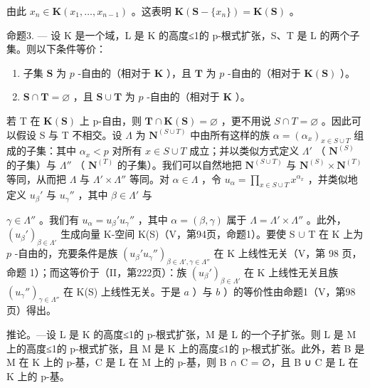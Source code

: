 由此 \(x_{n} \in \mathbf{K}(x_{1}, \ldots, x_{n-1})\) 。这表明 \(\mathbf{K}(\mathbf{S} - \{x_{n}\}) = \mathbf{K}(\mathbf{S})\) 。

命题3. --- 设 K 是一个域，L 是 K 的高度≤1的 p-根式扩张，S、T 是 L 的两个子集。则以下条件等价：

\begin{enumerate}
\def\labelenumi{\alph{enumi})}
\item
  子集 \(\mathbf{S}\) 为 \(p\) -自由的（相对于 \(\mathbf{K}\) ），且 \(\mathbf{T}\) 为 \(p\) -自由的（相对于 \(\mathbf{K}(\mathbf{S})\) ）。
\item
  \(\mathbf{S} \cap \mathbf{T} = \varnothing\) ，且 \(\mathbf{S} \cup \mathbf{T}\) 为 \(p\) -自由的（相对于 \(\mathbf{K}\) ）。
\end{enumerate}

若 T 在 \(\mathbf{K}(\mathbf{S})\) 上 p-自由，则 \(\mathbf{T} \cap \mathbf{K}(\mathbf{S}) = \varnothing\) ，更不用说 \(S \cap T = \varnothing\) 。因此可以假设 S 与 T 不相交。设 \(\Lambda\) 为 \(\mathbf{N}^{(S \cup T)}\) 中由所有这样的族 \(\alpha = (\alpha_x)_{x \in S \cup T}\) 组成的子集：其中 \(\alpha_x < p\) 对所有 \(x \in S \cup T\) 成立；并以类似方式定义 \(\Lambda'\) （ \(\mathbf{N}^{(S)}\) 的子集）与 \(\Lambda''\) （ \(\mathbf{N}^{(T)}\) 的子集）。我们可以自然地把 \(\mathbf{N}^{(S \cup T)}\) 与 \(\mathbf{N}^{(S)} \times \mathbf{N}^{(T)}\) 等同，从而把 \(\Lambda\) 与 \(\Lambda' \times \Lambda''\) 等同。对 \(\alpha \in \Lambda\) ，令 \(u_\alpha = \prod_{x \in S \cup T} x^{\alpha_x}\) ，并类似地定义 \(u_\beta'\) 与 \(u_\gamma''\) ，其中 \(\beta \in \Lambda'\) 与

\(\gamma \in \Lambda''\) 。我们有 \(u_{\alpha} = u_{\beta}' u_{\gamma}''\) ，其中 \(\alpha = (\beta, \gamma)\) 属于 \(\Lambda = \Lambda' \times \Lambda''\) 。此外， \((u_{\beta}')_{\beta \in \Lambda'}\) 生成向量 K-空间 K(S)（V，第94页，命题1）。要使 S \(\cup\) T 在 K 上为 \(p\) -自由的，充要条件是族 \((u_{\beta}' u_{\gamma}'')_{\beta \in \Lambda', \gamma \in \Lambda''}\) 在 K 上线性无关（V，第 98 页，命题 1）；而这等价于（II，第222页）：族 \((u_{\beta}')_{\beta \in \Lambda'}\) 在 K 上线性无关且族 \((u_{\gamma}'')_{\gamma \in \Lambda''}\) 在 K(S) 上线性无关。于是 \(a\) ）与 \(b\) ）的等价性由命题1（V，第98页）得出。

推论。---设 L 是 K 的高度≤1的 p-根式扩张，M 是 L 的一个子扩张。则 L 是 M 上的高度≤1的 p-根式扩张，且 M 是 K 上的高度≤1的 p-根式扩张。此外，若 B 是 M 在 K 上的 p-基，C 是 L 在 M 上的 p-基，则 B ∩ C = ∅，且 B ∪ C 是 L 在 K 上的 p-基。

